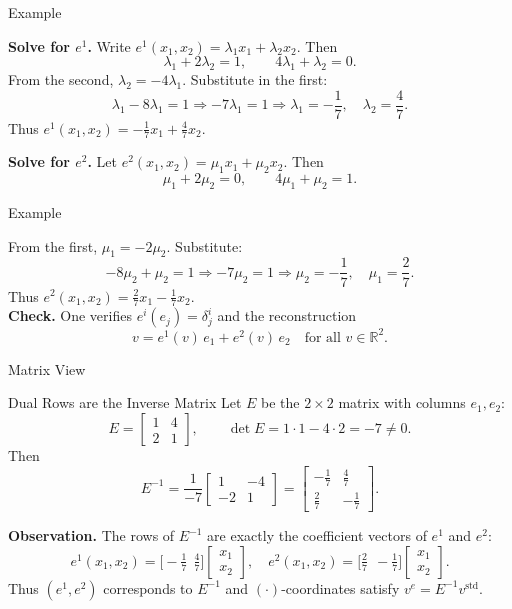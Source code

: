 \begin{frame}{Example}
    \begin{block}{}
        \textbf{Solve for $e^1$.} Write $e^1(x_1,x_2)=\lambda_1 x_1+\lambda_2 x_2$. Then
\[
\lambda_1+2\lambda_2=1,\qquad 4\lambda_1+\lambda_2=0.
\]
From the second, $\lambda_2=-4\lambda_1$. Substitute in the first:
\[
\lambda_1-8\lambda_1=1 \Rightarrow -7\lambda_1=1 \Rightarrow \lambda_1=-\frac{1}{7},\quad \lambda_2=\frac{4}{7}.
\]
Thus $e^1(x_1,x_2)=-\frac{1}{7}x_1+\frac{4}{7}x_2$.

\textbf{Solve for $e^2$.} Let $e^2(x_1,x_2)=\mu_1 x_1+\mu_2 x_2$. Then
\[
\mu_1+2\mu_2=0,\qquad 4\mu_1+\mu_2=1.
\]
\end{block}
\end{frame}
\begin{frame}{Example}
\begin{block}{}
    From the first, $\mu_1=-2\mu_2$. Substitute:
\[
-8\mu_2+\mu_2=1 \Rightarrow -7\mu_2=1 \Rightarrow \mu_2=-\frac{1}{7},\quad \mu_1=\frac{2}{7}.
\]
Thus $e^2(x_1,x_2)=\frac{2}{7}x_1-\frac{1}{7}x_2$.\\

\textbf{Check.} One verifies $e^i(e_j)=\delta^i_j$ and the reconstruction
\[
v = e^1(v)\,e_1 + e^2(v)\,e_2 \quad \text{for all } v\in \mathbb{R}^2.
\]
    \end{block}

\end{frame}

\begin{frame}{Matrix View}
\vspace{-0.2cm}
\begin{block}{Dual Rows are the Inverse Matrix}
    Let $E$ be the $2\times 2$ matrix with columns $e_1,e_2$:
\[
E=
\begin{bmatrix}
1 & 4\\
2 & 1
\end{bmatrix},\qquad \det E = 1\cdot 1 - 4\cdot 2 = -7\neq 0.
\]
Then
\[
E^{-1}=\frac{1}{-7}
\begin{bmatrix}
1 & -4\\
-2 & 1
\end{bmatrix}
=
\begin{bmatrix}
-\tfrac{1}{7} & \tfrac{4}{7}\\[2pt]
\tfrac{2}{7} & -\tfrac{1}{7}
\end{bmatrix}.
\]
\end{block}
\vspace{-0.2cm}
\textbf{Observation.} The rows of $E^{-1}$ are exactly the coefficient vectors of $e^1$ and $e^2$:
\[
e^1(x_1,x_2)=\bigl[-\tfrac{1}{7}\ \ \tfrac{4}{7}\bigr]\!\begin{bmatrix}x_1\\ x_2\end{bmatrix},\quad
e^2(x_1,x_2)=\bigl[\tfrac{2}{7}\ \ -\tfrac{1}{7}\bigr]\!\begin{bmatrix}x_1\\ x_2\end{bmatrix}.
\]
Thus $(e^1,e^2)$ corresponds to $E^{-1}$ and $(\cdot)$-coordinates satisfy $v^e=E^{-1} v^{\text{std}}$.
\end{frame}

